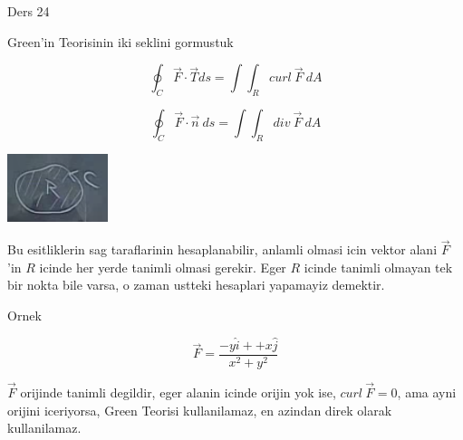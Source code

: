 \documentclass[12pt,fleqn]{article}
\begin{document}
Ders 24

Green'in Teorisinin iki seklini gormustuk

\[ \oint_C \vec{F} \cdot \vec{T} ds = \int \int_R curl \ \vec{F} \ dA \]

\[ \oint_C \vec{F} \cdot \vec{n} \ ds = \int \int_R div \ \vec{F} \ dA \]


\includegraphics[height=2cm]{24_1.png}

Bu esitliklerin sag taraflarinin hesaplanabilir, anlamli olmasi icin vektor
alani $\vec{F}$'in $R$ icinde her yerde tanimli olmasi gerekir. Eger $R$
icinde tanimli olmayan tek bir nokta bile varsa, o zaman ustteki hesaplari
yapamayiz demektir.

Ornek 

\[ \vec{F} = \frac{ -y\hat{i} + +x\hat{j}}{x^2+y^2} \]

$\vec{F}$ orijinde tanimli degildir, eger alanin icinde orijin yok ise,
$curl \ \vec{F} = 0$, ama ayni orijini iceriyorsa, Green Teorisi
kullanilamaz, en azindan direk olarak kullanilamaz. 
\end{document}

